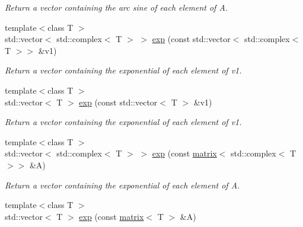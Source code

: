 \begin{DoxyCompactItemize}
\begin{DoxyCompactList}\small\item\em Return a vector containing the arc sine of each element of A. \end{DoxyCompactList}\item 
\hypertarget{namespacekeycpp_a50caa1bee883d40591442882e777a67b}{{\footnotesize template$<$class T $>$ }\\std\-::vector$<$ std\-::complex$<$ T $>$ $>$ \hyperlink{namespacekeycpp_a50caa1bee883d40591442882e777a67b}{exp} (const std\-::vector$<$ std\-::complex$<$ T $>$$>$ \&v1)}\label{namespacekeycpp_a50caa1bee883d40591442882e777a67b}

\begin{DoxyCompactList}\small\item\em Return a vector containing the exponential of each element of v1. \end{DoxyCompactList}\item 
\hypertarget{namespacekeycpp_a66a68550626786b480e7c8d02aaf9039}{{\footnotesize template$<$class T $>$ }\\std\-::vector$<$ T $>$ \hyperlink{namespacekeycpp_a66a68550626786b480e7c8d02aaf9039}{exp} (const std\-::vector$<$ T $>$ \&v1)}\label{namespacekeycpp_a66a68550626786b480e7c8d02aaf9039}

\begin{DoxyCompactList}\small\item\em Return a vector containing the exponential of each element of v1. \end{DoxyCompactList}\item 
\hypertarget{namespacekeycpp_a6a8bd2143a6d613b560f71d0b99b346f}{{\footnotesize template$<$class T $>$ }\\std\-::vector$<$ std\-::complex$<$ T $>$ $>$ \hyperlink{namespacekeycpp_a6a8bd2143a6d613b560f71d0b99b346f}{exp} (const \hyperlink{classkeycpp_1_1matrix}{matrix}$<$ std\-::complex$<$ T $>$$>$ \&A)}\label{namespacekeycpp_a6a8bd2143a6d613b560f71d0b99b346f}

\begin{DoxyCompactList}\small\item\em Return a vector containing the exponential of each element of A. \end{DoxyCompactList}\item 
\hypertarget{namespacekeycpp_a6cc8180fd2f17512f0f75957615da294}{{\footnotesize template$<$class T $>$ }\\std\-::vector$<$ T $>$ \hyperlink{namespacekeycpp_a6cc8180fd2f17512f0f75957615da294}{exp} (const \hyperlink{classkeycpp_1_1matrix}{matrix}$<$ T $>$ \&A)}\label{namespacekeycpp_a6cc8180fd2f17512f0f75957615da294}


\end{DoxyCompactItemize}
